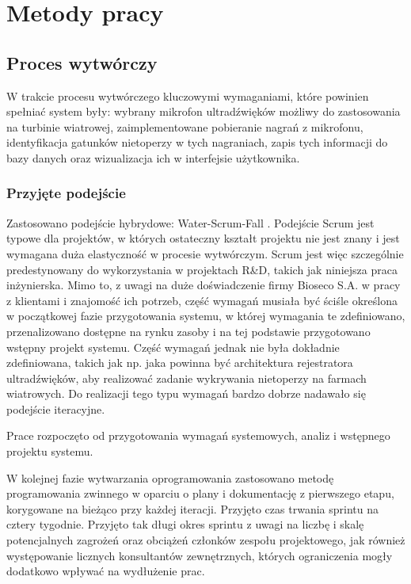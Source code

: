 \documentclass{sprz}
\begin{document}
\chapter{Metody pracy}

\section{Proces wytwórczy}
W trakcie procesu wytwórczego kluczowymi wymaganiami, które powinien spełniać system były: wybrany mikrofon ultradźwięków możliwy do zastosowania na turbinie wiatrowej, zaimplementowane pobieranie nagrań z mikrofonu, identyfikacja gatunków nietoperzy w tych nagraniach, zapis tych informacji do bazy danych oraz wizualizacja ich w interfejsie użytkownika. 

\subsection{Przyjęte podejście}
Zastosowano podejście hybrydowe: Water-Scrum-Fall \cite{water-scrum-fall1} \cite{water-scrum-fall2} \cite{water-scrum-fall3}. Podejście Scrum jest typowe dla projektów, w których ostateczny kształt projektu nie jest znany i jest wymagana duża elastyczność w procesie wytwórczym. Scrum jest więc szczególnie predestynowany do wykorzystania w projektach R\&D, takich jak niniejsza praca inżynierska. Mimo to, z uwagi na duże doświadczenie firmy Bioseco S.A. w pracy z klientami i znajomość ich potrzeb, część wymagań musiała być ściśle określona w początkowej fazie przygotowania systemu, w której wymagania te zdefiniowano, przenalizowano dostępne na rynku zasoby i na tej podstawie przygotowano wstępny projekt systemu. Część wymagań jednak nie była dokładnie zdefiniowana, takich jak np. jaka powinna być architektura rejestratora ultradźwięków, aby realizować zadanie wykrywania nietoperzy na farmach wiatrowych. Do realizacji tego typu wymagań bardzo dobrze nadawało się podejście iteracyjne.

Prace rozpoczęto od przygotowania wymagań systemowych, analiz i wstępnego projektu systemu. 

W kolejnej fazie wytwarzania oprogramowania zastosowano metodę programowania zwinnego w oparciu o plany i dokumentację z pierwszego etapu, korygowane na bieżąco przy każdej iteracji. Przyjęto czas trwania sprintu na cztery tygodnie. Przyjęto tak długi okres sprintu z uwagi na liczbę i skalę potencjalnych zagrożeń oraz obciążeń członków zespołu projektowego, jak również występowanie licznych konsultantów zewnętrznych, których ograniczenia mogły dodatkowo wpływać na wydłużenie prac. 
\end{document}
